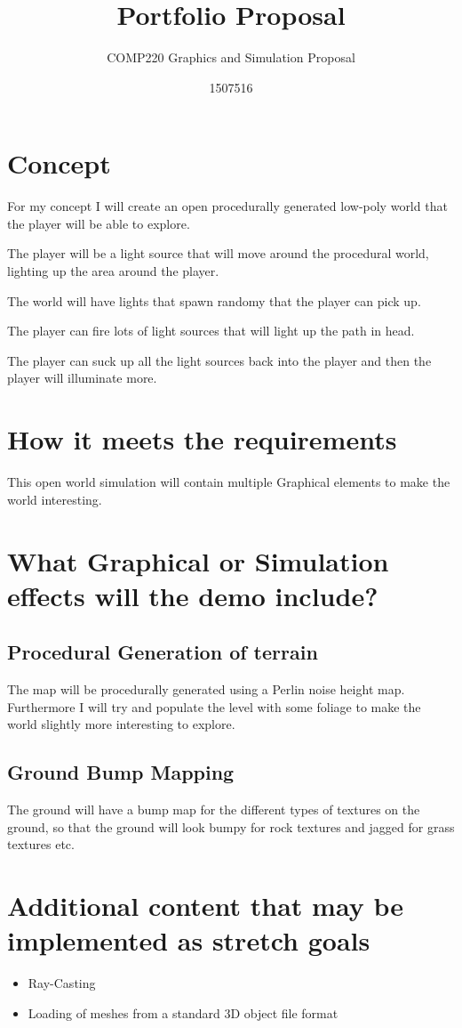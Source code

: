 \documentclass{scrartcl}
\title{Portfolio Proposal}
\subtitle{COMP220 Graphics and Simulation Proposal}
\author{1507516}
\begin{document}
\maketitle

\abstract{}

\section{Concept}
For my concept I will create an open procedurally generated low-poly world that the player will be able to explore.

The player will be a light source that will move around the procedural world, lighting up the area around the player.

The world will have lights that spawn randomy that the player can pick up.

The player can fire lots of light sources that will light up the path in head.

The player can suck up all the light sources back into the player and then the player will illuminate more.

\section{How it meets the requirements}

This open world simulation will contain multiple Graphical elements to make the world interesting.

\section{What Graphical or Simulation effects will the demo include?}

\subsection{Procedural Generation of terrain}

The map will be procedurally generated using a Perlin noise height map. Furthermore I will try and populate the level with some foliage to make the world slightly more interesting to explore.

\subsection{Ground Bump Mapping}

The ground will have a bump map for the different types of textures on the ground, so that the ground will look bumpy for rock textures and jagged for grass textures etc.

\section{Additional content that may be implemented as stretch goals}


\begin{itemize}
\item Ray-Casting
\item Loading of meshes from a standard 3D object file format
\end{itemize}
\end{document}

